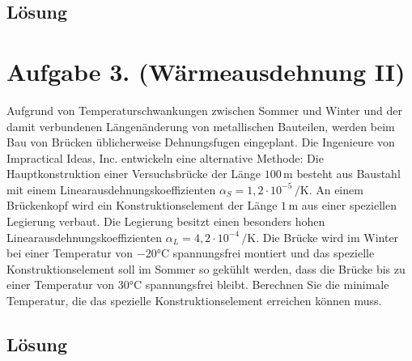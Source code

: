\documentclass[german,12pt]{homework}
\newcommand{\sis}[1]{\,\si{#1}}
\newcommand{\degC}{\si{\degreeCelsius}}
\begin{document}
    \subsection*{Lösung}

    \section*{Aufgabe 3. (Wärmeausdehnung II)}

    \begin{problem}
        Aufgrund von Temperaturschwankungen zwischen Sommer und Winter und der
        damit verbundenen Längenänderung von metallischen Bauteilen, werden
        beim Bau von Brücken üblicherweise Dehnungsfugen eingeplant. Die
        Ingenieure von Impractical Ideas, Inc. entwickeln eine alternative
        Methode: Die Hauptkonstruktion einer Versuchsbrücke der Länge
        \(100\sis{\meter}\) besteht aus Baustahl mit einem
        Linearausdehnungskoeffizienten \(\alpha_S = 1,2 \cdot 10^{-5}
        \sis{\per\kelvin}\). An einem Brückenkopf wird ein Konstruktionselement
        der Länge \(1\sis{\meter}\) aus einer speziellen Legierung verbaut. Die
        Legierung besitzt einen besonders hohen Linearausdehnungskoeffizienten
        \(\alpha_L = 4,2 \cdot 10^{-4}\sis{\per\kelvin}\). Die Brücke wird im
        Winter bei einer Temperatur von \(-20\degC\) spannungsfrei montiert und
        das spezielle Konstruktionselement soll im Sommer so gekühlt werden,
        dass die Brücke bis zu einer Temperatur von \(30\degC\) spannungsfrei
        bleibt. Berechnen Sie die minimale Temperatur, die das spezielle
        Konstruktionselement erreichen können muss.
    \end{problem}

    \subsection*{Lösung}
\end{document}
